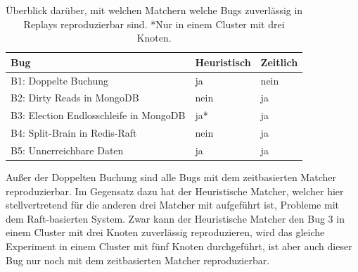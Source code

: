\documentclass[12pt,a4paper]{report}
\begin{document}
\begin{table}[H]
	\centering
	\caption{Überblick darüber, mit welchen Matchern welche Bugs zuverlässig in Replays reproduzierbar sind. *Nur in einem Cluster mit
		drei Knoten.}
	\label{tab:debug}
	\begin{tabular}{|l|l|l|}
		\hline
		Bug                                    & Heuristisch & Zeitlich \\ \hline
		B1: Doppelte Buchung                   & ja          & nein     \\ \hline
		B2: Dirty Reads in MongoDB             & nein        & ja       \\ \hline
		B3: Election Endlosschleife in MongoDB & ja*         & ja       \\ \hline
		B4: Split-Brain in Redis-Raft          & nein        & ja       \\ \hline
		B5: Unnerreichbare Daten               & ja          & ja       \\ \hline
	\end{tabular}
\end{table}

Außer der Doppelten Buchung sind alle Bugs mit dem zeitbasierten Matcher reproduzierbar. Im Gegensatz dazu hat der Heuristische
Matcher, welcher hier stellvertretend für die anderen drei Matcher mit aufgeführt ist, Probleme mit dem Raft-basierten System.
Zwar kann der Heuristische Matcher den Bug 3 in einem Cluster mit drei Knoten zuverlässig reproduzieren, wird das gleiche
Experiment in einem Cluster mit fünf Knoten durchgeführt, ist aber auch dieser Bug nur noch mit dem zeitbasierten Matcher
reproduzierbar.

% 
% 
\end{document}

